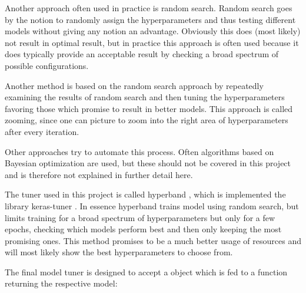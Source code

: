 Another approach often used in practice is random search.
Random search goes by the notion to randomly assign the hyperparameters and thus testing different models without giving any notion an advantage.
Obviously this does (most likely) not result in optimal result, but in practice this approach is often used because it does typically provide an acceptable result by checking a broad spectrum of possible configurations.

Another method is based on the random search approach by repeatedly examining the results of random search and then tuning the hyperparameters favoring those which promise to result in better models.
This approach is called zooming, since one can picture to zoom into the right area of hyperparameters after every iteration.

Other approaches try to automate this process.
Often algorithms based on Bayesian optimization are used, but these should not be covered in this project and is therefore not explained in further detail here.

The tuner used in this project is called hyperband \cite{Li2018}, which is implemented the library keras-tuner \cite{Google2019a}.
In essence hyperband trains model using random search, but limits training for a broad spectrum of hyperparameters but only for a few epochs, checking which models perform best and then only keeping the most promising ones.
This method promises to be a much better usage of resources and will most likely show the best hyperparameters to choose from.

The final model tuner %
is designed to accept a  object which is fed to a function returning the respective model:


